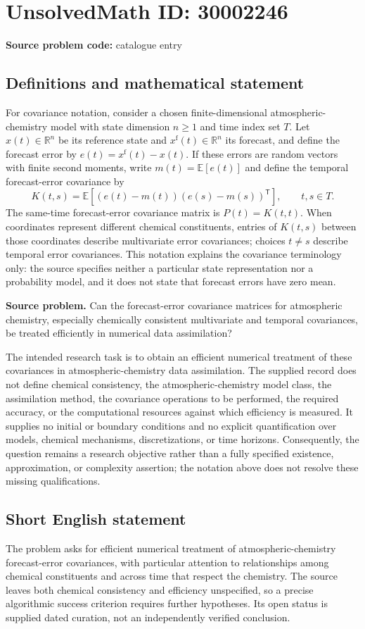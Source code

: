 \documentclass[11pt]{article}
\newcommand{\R}{\mathbb{R}}
\newcommand{\E}{\mathbb{E}}
\begin{document}
\section*{UnsolvedMath ID: 30002246}
\textbf{Source problem code:} catalogue entry
\subsection{Definitions and mathematical statement}
For covariance notation, consider a chosen finite-dimensional atmospheric-chemistry model with state dimension \(n\geq 1\) and time index set \(T\). Let \(x(t)\in\R^n\) be its reference state and \(x^{\mathrm f}(t)\in\R^n\) its forecast, and define the forecast error by \(e(t)=x^{\mathrm f}(t)-x(t)\). If these errors are random vectors with finite second moments, write \(m(t)=\E[e(t)]\) and define the temporal forecast-error covariance by
\[
K(t,s)=\E\!\left[(e(t)-m(t))(e(s)-m(s))^{\mathsf T}\right],\qquad t,s\in T.
\]
The same-time forecast-error covariance matrix is \(P(t)=K(t,t)\). When coordinates represent different chemical constituents, entries of \(K(t,s)\) between those coordinates describe multivariate error covariances; choices \(t\ne s\) describe temporal error covariances. This notation explains the covariance terminology only: the source specifies neither a particular state representation nor a probability model, and it does not state that forecast errors have zero mean.

\textbf{Source problem.} Can the forecast-error covariance matrices for atmospheric chemistry, especially chemically consistent multivariate and temporal covariances, be treated efficiently in numerical data assimilation?

The intended research task is to obtain an efficient numerical treatment of these covariances in atmospheric-chemistry data assimilation. The supplied record does not define chemical consistency, the atmospheric-chemistry model class, the assimilation method, the covariance operations to be performed, the required accuracy, or the computational resources against which efficiency is measured. It supplies no initial or boundary conditions and no explicit quantification over models, chemical mechanisms, discretizations, or time horizons. Consequently, the question remains a research objective rather than a fully specified existence, approximation, or complexity assertion; the notation above does not resolve these missing qualifications.
\subsection{Short English statement}
The problem asks for efficient numerical treatment of atmospheric-chemistry forecast-error covariances, with particular attention to relationships among chemical constituents and across time that respect the chemistry. The source leaves both chemical consistency and efficiency unspecified, so a precise algorithmic success criterion requires further hypotheses. Its open status is supplied dated curation, not an independently verified conclusion.
\end{document}
